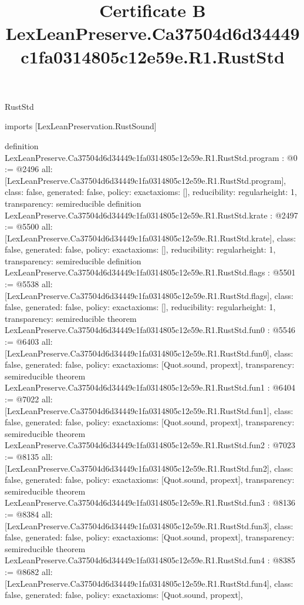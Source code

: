 \begin{lexlean}{RustStd}
\title{Certificate B LexLeanPreserve.Ca37504d6d34449c1fa0314805c12e59e.R1.RustStd}
\begin{coremodule}
imports [LexLeanPreservation.RustSound]

definition LexLeanPreserve.Ca37504d6d34449c1fa0314805c12e59e.R1.RustStd.program : @0 := @2496 {
  all: [LexLeanPreserve.Ca37504d6d34449c1fa0314805c12e59e.R1.RustStd.program],
  class: false,
  generated: false,
  policy: exact{axioms: []},
  reducibility: regular{height: 1},
  transparency: semireducible
}
definition LexLeanPreserve.Ca37504d6d34449c1fa0314805c12e59e.R1.RustStd.krate : @2497 := @5500 {
  all: [LexLeanPreserve.Ca37504d6d34449c1fa0314805c12e59e.R1.RustStd.krate],
  class: false,
  generated: false,
  policy: exact{axioms: []},
  reducibility: regular{height: 1},
  transparency: semireducible
}
definition LexLeanPreserve.Ca37504d6d34449c1fa0314805c12e59e.R1.RustStd.flags : @5501 := @5538 {
  all: [LexLeanPreserve.Ca37504d6d34449c1fa0314805c12e59e.R1.RustStd.flags],
  class: false,
  generated: false,
  policy: exact{axioms: []},
  reducibility: regular{height: 1},
  transparency: semireducible
}
theorem LexLeanPreserve.Ca37504d6d34449c1fa0314805c12e59e.R1.RustStd.fun0 : @5546 := @6403 {
  all: [LexLeanPreserve.Ca37504d6d34449c1fa0314805c12e59e.R1.RustStd.fun0],
  class: false,
  generated: false,
  policy: exact{axioms: [Quot.sound, propext]},
  transparency: semireducible
}
theorem LexLeanPreserve.Ca37504d6d34449c1fa0314805c12e59e.R1.RustStd.fun1 : @6404 := @7022 {
  all: [LexLeanPreserve.Ca37504d6d34449c1fa0314805c12e59e.R1.RustStd.fun1],
  class: false,
  generated: false,
  policy: exact{axioms: [Quot.sound, propext]},
  transparency: semireducible
}
theorem LexLeanPreserve.Ca37504d6d34449c1fa0314805c12e59e.R1.RustStd.fun2 : @7023 := @8135 {
  all: [LexLeanPreserve.Ca37504d6d34449c1fa0314805c12e59e.R1.RustStd.fun2],
  class: false,
  generated: false,
  policy: exact{axioms: [Quot.sound, propext]},
  transparency: semireducible
}
theorem LexLeanPreserve.Ca37504d6d34449c1fa0314805c12e59e.R1.RustStd.fun3 : @8136 := @8384 {
  all: [LexLeanPreserve.Ca37504d6d34449c1fa0314805c12e59e.R1.RustStd.fun3],
  class: false,
  generated: false,
  policy: exact{axioms: [Quot.sound, propext]},
  transparency: semireducible
}
theorem LexLeanPreserve.Ca37504d6d34449c1fa0314805c12e59e.R1.RustStd.fun4 : @8385 := @8682 {
  all: [LexLeanPreserve.Ca37504d6d34449c1fa0314805c12e59e.R1.RustStd.fun4],
  class: false,
  generated: false,
  policy: exact{axioms: [Quot.sound, propext]},
}
\end{coremodule}
\end{lexlean}
